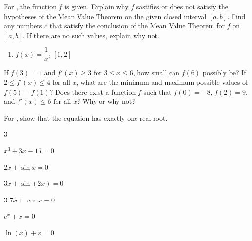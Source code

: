 \documentclass{book}
\begin{document}
For , the function $f$ is given. Explain why $f$ sastifies or does not satisfy the hypotheses of the Mean Value Theorem on the given closed interval $[a,b]$. Find any numbers $c$ that satisfy the conclusion of the Mean Value Theorem for $f$ on $[a,b]$. If there are no such values, explain why not.
\begin{enumerate}[!HW!]
\begin{multicols}{3}
\itemspade $f(x) =1-x^{2/3}$, $[-1,1]$ 
\itemspade $f(x) =\cos(3x)$, $\left[\dfrac{\pi}{12},\dfrac{7\pi}{12}\right]$ 
\itemspade $f(x) =(x-3)^{-2}$, $[2,5]$ 
\end{multicols}
\item\label{exer:meanvaluecriteria:stop} $f(x) = \dfrac{1}{x}$, $[1,2]$ 
\end{enumerate}

\begin{enumerate}[!HW!]
\itemspade If $f(3)=1$ and $f'(x)\ge 3$ for $3\le x\le 6$, how small can $f(6)$ possibly be? 
\itemspade If $2\le f'(x)\le 4$ for all $x$, what are the minimum and maximum possible values of $f(5)-f(1)$? 
\itemspade Does there exist a function $f$ such that $f(0)=-8$, $f(2)=9$, and $f'(x)\le 6$ for all $x$? Why or why not? 
\end{enumerate}

For , show that the equation has exactly one real root.
\begin{enumerate}[!HW!]
\begin{multicols}{3}
\item\label{exer:meanvaluetheorem:start} $x^3+3x-15=0$
\item $2x+\sin x=0$ 
\item $3x+\sin(2x)=0$ 
\end{multicols}
\begin{multicols}{3}
\itemspade $7x+\cos x=0$ 
\item $e^x+x=0$ 
\item\label{exer:meanvaluetheorem:stop} $\ln(x)+x=0$ 
\end{multicols}
\end{enumerate}
\pagebreak
\end{document}
